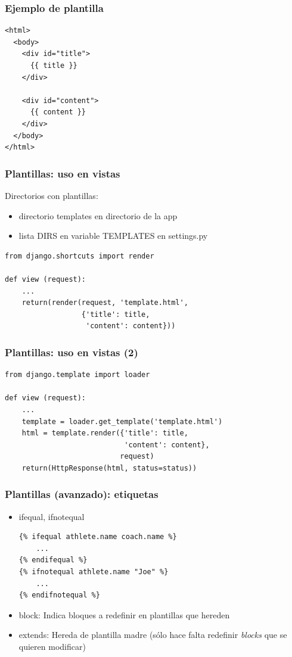 \begin{frame}[fragile]
\frametitle{Ejemplo de plantilla}

\begin{verbatim}
<html>
  <body>
    <div id="title">
      {{ title }}
    </div>

    <div id="content">
      {{ content }}
    </div>
  </body>
</html>
\end{verbatim}

\end{frame}


\begin{frame}[fragile]
\frametitle{Plantillas: uso en vistas}

Directorios con plantillas:
\begin{itemize}
  \item directorio templates en directorio de la app
  \item lista DIRS en variable TEMPLATES en settings.py
\end{itemize}
 
\begin{verbatim}
from django.shortcuts import render

def view (request):
    ...
    return(render(request, 'template.html',
                  {'title': title,
                   'content': content}))
\end{verbatim}
\end{frame}

\begin{frame}[fragile]
\frametitle{Plantillas: uso en vistas (2)}

 
\begin{verbatim}
from django.template import loader

def view (request):
    ...
    template = loader.get_template('template.html')
    html = template.render({'title': title,
                            'content': content},
                           request)
    return(HttpResponse(html, status=status))
\end{verbatim}
\end{frame}

\begin{frame}[fragile]
\frametitle{Plantillas (avanzado): etiquetas}

\begin{itemize}
\item ifequal, ifnotequal
\begin{verbatim}
{% ifequal athlete.name coach.name %}
    ...
{% endifequal %}
{% ifnotequal athlete.name "Joe" %}
    ...
{% endifnotequal %}
\end{verbatim}
\item block: Indica bloques a redefinir en plantillas que hereden
\item extends: Hereda de plantilla madre (sólo hace falta redefinir
 \emph{blocks} que se quieren modificar)
\end{itemize}
\end{frame}


